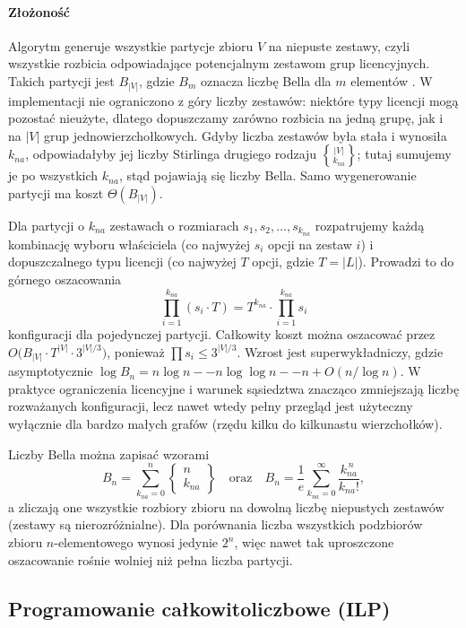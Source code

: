 \paragraph{Złożoność}
Algorytm generuje wszystkie partycje zbioru \(V\) na niepuste zestawy, czyli wszystkie rozbicia odpowiadające potencjalnym zestawom grup licencyjnych. Takich partycji jest \(B_{|V|}\), gdzie \(B_m\) oznacza liczbę Bella dla \(m\) elementów \cite{stanley1997enumerative}. W implementacji nie ograniczono z góry liczby zestawów: niektóre typy licencji mogą pozostać nieużyte, dlatego dopuszczamy zarówno rozbicia na jedną grupę, jak i na \(|V|\) grup jednowierzchołkowych. Gdyby liczba zestawów była stała i wynosiła \(k_{na}\), odpowiadałyby jej liczby Stirlinga drugiego rodzaju \({|V| \brace k_{na}}\); tutaj sumujemy je po wszystkich \(k_{na}\), stąd pojawiają się liczby Bella. Samo wygenerowanie partycji ma koszt $\Theta(B_{|V|})$.

Dla partycji o \(k_{na}\) zestawach o rozmiarach \(s_1, s_2, \ldots, s_{k_{na}}\) rozpatrujemy każdą kombinację wyboru właściciela (co najwyżej \(s_i\) opcji na zestaw \(i\)) i dopuszczalnego typu licencji (co najwyżej \(T\) opcji, gdzie \(T=|L|\)). Prowadzi to do górnego oszacowania
\[
  \prod_{i=1}^{k_{na}} (s_i \cdot T) = T^{k_{na}} \cdot \prod_{i=1}^{k_{na}} s_i
\]
konfiguracji dla pojedynczej partycji. Całkowity koszt można oszacować przez \(O\bigl(B_{|V|} \cdot T^{|V|} \cdot 3^{|V|/3}\bigr)\), ponieważ \(\prod s_i \leq 3^{|V|/3}\). Wzrost jest superwykładniczy, gdzie asymptotycznie \(\log B_n = n\log n -- n\log\log n -- n + O(n/\log n)\). W praktyce ograniczenia licencyjne i warunek sąsiedztwa znacząco zmniejszają liczbę rozważanych konfiguracji, lecz nawet wtedy pełny przegląd jest użyteczny wyłącznie dla bardzo małych grafów (rzędu kilku do kilkunastu wierzchołków).

Liczby Bella można zapisać wzorami
\[
  B_n = \sum_{k_{na}=0}^{n} \left\{\!\!\begin{array}{c} n \\ k_{na} \end{array}\!\!\right\}\quad\text{oraz}\quad B_n = \frac{1}{e}\sum_{k_{na}=0}^{\infty}\frac{k_{na}^{\,n}}{k_{na}!},
\]
a zliczają one wszystkie rozbiory zbioru na dowolną liczbę niepustych zestawów (zestawy są nierozróżnialne). Dla porównania liczba wszystkich podzbiorów zbioru \(n\)-elementowego wynosi jedynie \(2^n\), więc nawet tak uproszczone oszacowanie rośnie wolniej niż pełna liczba partycji.

\subsection{Programowanie całkowitoliczbowe (ILP)}\label{subsec:ilp}

